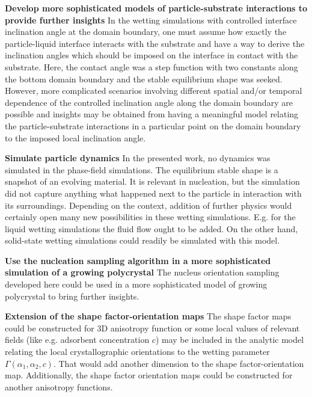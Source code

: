 \textbf{Develop more sophisticated models of particle-substrate interactions to provide further insights} In the wetting simulations with controlled interface inclination angle at the domain boundary, one must assume how exactly the particle-liquid interface interacts with the substrate and have a way to derive the inclination angles which should be imposed on the interface in contact with the substrate. Here, the contact angle was a step function with two constants along the bottom domain boundary and the stable equilibrium shape was seeked. However, more complicated scenarios involving different spatial and/or temporal dependence of the controlled inclination angle along the domain boundary are possible and insights may be obtained from having a meaningful model relating the particle-substrate interactions in a particular point on the domain boundary to the imposed local inclination angle.
	
\textbf{Simulate particle dynamics} In the presented work, no dynamics was simulated in the phase-field simulations. The equilibrium stable shape is a snapshot of an evolving material. It is relevant in nucleation, but the simulation did not capture anything what happened next to the particle in interaction with its surroundings. Depending on the context, addition of further physics would certainly open many new possibilities in these wetting simulations. E.g. for the liquid wetting simulations the fluid flow ought to be added. On the other hand, solid-state wetting simulations could readily be simulated with this model. 
	
\textbf{Use the nucleation sampling algorithm in a more sophisticated simulation of a growing polycrystal} The nucleus orientation sampling developed here could be used in a more sophisticated model of growing polycrystal to bring further insights. 

\textbf{Extension of the shape factor-orientation maps} The shape factor maps could be constructed for 3D anisotropy function or some local values of relevant fields (like e.g. adsorbent concentration $c$) may be included in the analytic model relating the local crystallographic orientations to the wetting parameter $\Gamma(\alpha_1,\alpha_2, c)$. That would add another dimension to the shape factor-orientation map. Additionally, the shape factor orientation maps could be constructed for another anisotropy functions.



\cleardoublepage

